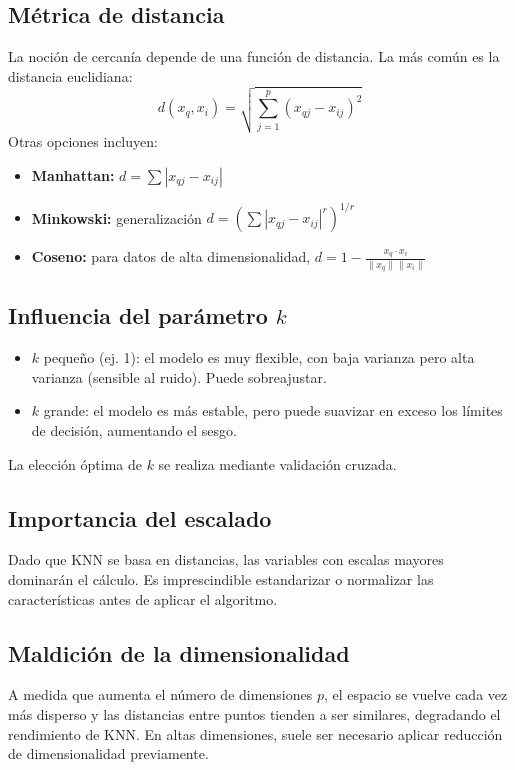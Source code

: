 \documentclass[12pt,a4paper,openany,oneside]{book}
\begin{document}
\subsection{Métrica de distancia}
La noción de cercanía depende de una función de distancia. La más común es la distancia euclidiana:
\[
d(x_q, x_i) = \sqrt{\sum_{j=1}^p (x_{qj} - x_{ij})^2}
\]
Otras opciones incluyen:
\begin{itemize}
    \item \textbf{Manhattan:} \(d = \sum |x_{qj} - x_{ij}|\)
    \item \textbf{Minkowski:} generalización \(d = \left(\sum |x_{qj} - x_{ij}|^r\right)^{1/r}\)
    \item \textbf{Coseno:} para datos de alta dimensionalidad, \(d = 1 - \frac{x_q \cdot x_i}{\|x_q\| \|x_i\|}\)
\end{itemize}

\subsection{Influencia del parámetro \(k\)}
\begin{itemize}
    \item \(k\) pequeño (ej. 1): el modelo es muy flexible, con baja varianza pero alta varianza (sensible al ruido). Puede sobreajustar.
    \item \(k\) grande: el modelo es más estable, pero puede suavizar en exceso los límites de decisión, aumentando el sesgo.
\end{itemize}
La elección óptima de \(k\) se realiza mediante validación cruzada.

\subsection{Importancia del escalado}
Dado que KNN se basa en distancias, las variables con escalas mayores dominarán el cálculo. Es imprescindible estandarizar o normalizar las características antes de aplicar el algoritmo.

\subsection{Maldición de la dimensionalidad}
A medida que aumenta el número de dimensiones \(p\), el espacio se vuelve cada vez más disperso y las distancias entre puntos tienden a ser similares, degradando el rendimiento de KNN. En altas dimensiones, suele ser necesario aplicar reducción de dimensionalidad previamente.
\end{document}
